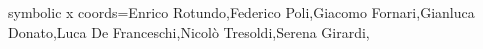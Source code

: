 symbolic x coords={Enrico Rotundo,Federico Poli,Giacomo Fornari,Gianluca Donato,Luca De Franceschi,Nicolò Tresoldi,Serena Girardi,}

